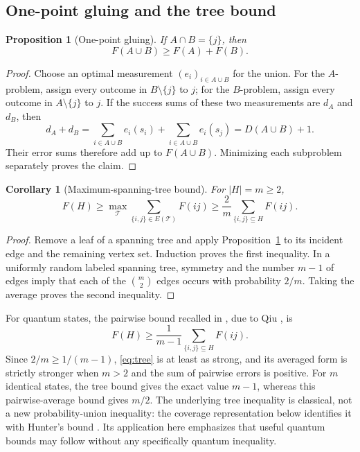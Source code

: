 \documentclass[a4paper,11pt,onecolumn,unpublished]{quantumarticle}
\newtheorem{proposition}[theorem]{Proposition}
\newtheorem{corollary}[theorem]{Corollary}
\theoremstyle{definition}
\newcommand{\1}{\mathbf 1}
\begin{document}
\subsection{One-point gluing and the tree bound}\label{sec:universal}

\begin{proposition}[One-point gluing]\label{prop:one-point}
If $A\cap B=\{j\}$, then
\begin{equation}\label{eq:one-point}
 F(A\cup B)\ge F(A)+F(B).
\end{equation}
\end{proposition}
\begin{proof}
Choose an optimal measurement $(e_i)_{i\in A\cup B}$ for the union. For the
$A$-problem, assign every outcome in $B\setminus\{j\}$ to $j$; for the
$B$-problem, assign every outcome in $A\setminus\{j\}$ to $j$.
If the success sums of these two measurements are $d_A$ and $d_B$, then
\[
 d_A+d_B
 =\sum_{i\in A\cup B}e_i(s_i)+\sum_{i\in A\cup B}e_i(s_j)
 =D(A\cup B)+1.
\]
Their error sums therefore add up to $F(A\cup B)$. Minimizing each subproblem
separately proves the claim.
\end{proof}

\begin{corollary}[Maximum-spanning-tree bound]\label{cor:tree}
For $|H|=m\ge2$,
\begin{equation}\label{eq:tree}
 F(H)\ge\max_{\mathcal T}\sum_{\{i,j\}\in E(\mathcal T)}F(ij)
 \ge\frac{2}{m}\sum_{\{i,j\}\subseteq H}F(ij).
\end{equation}
\end{corollary}
\begin{proof}
Remove a leaf of a spanning tree and apply Proposition~\ref{prop:one-point}
to its incident edge and the remaining vertex set. Induction proves the first
inequality. In a uniformly random labeled spanning tree, symmetry and the
number $m-1$ of edges imply that each of the $\binom m2$ edges occurs with
probability $2/m$. Taking the average proves the second inequality.
\end{proof}

For quantum states, the pairwise bound recalled in
\cite[Eq.~(6)]{AudenaertMosonyi2014}, due to Qiu \cite{Qiu2008}, is
\[
 F(H)\ge\frac{1}{m-1}\sum_{\{i,j\}\subseteq H}F(ij).
\]
Since $2/m\ge1/(m-1)$, \eqref{eq:tree} is at least as strong, and its averaged
form is strictly stronger when $m>2$ and the sum of pairwise errors is positive.
For $m$ identical states, the tree bound gives the exact value $m-1$, whereas
this pairwise-average bound gives $m/2$.
The underlying tree inequality is classical, not a new probability-union
inequality: the coverage representation below identifies it with Hunter's
bound \cite{Hunter1976}. Its application here emphasizes that useful quantum
bounds may follow without any specifically quantum inequality.
\end{document}
